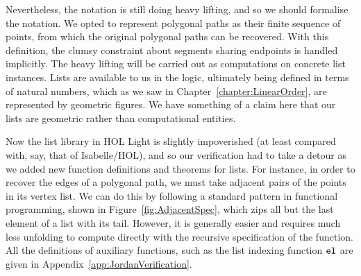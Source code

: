 

Nevertheless, the notation is still doing heavy lifting, and so we should formalise the notation. We opted to represent polygonal paths as their finite sequence of points, from which the original polygonal paths can be recovered. With this definition, the clumsy constraint about segments sharing endpoints is handled implicitly. The heavy lifting will be carried out as computations on concrete list instances. Lists are available to us in the logic, ultimately being defined in terms of natural numbers, which as we saw in Chapter~\ref{chapter:LinearOrder}, are represented by geometric figures. We have something of a claim here that our lists are geometric rather than computational entities.


Now the list library in HOL Light is slightly impoverished (at least compared with, say, that of Isabelle/HOL), and so our verification had to take a detour as we added new function definitions and theorems for lists. For instance, in order to recover the edges of a polygonal path, we must take adjacent pairs of the points in its vertex list. We can do this by following a standard pattern in functional programming, shown in Figure~\ref{fig:AdjacentSpec}, which zips all but the last element of a list with its tail. However, it is generally easier and requires much less unfolding to compute directly with the recursive specification of the function. All the definitions of auxiliary functions, such as the list indexing function $\texttt{el}$ are given in Appendix~\ref{app:JordanVerification}.

